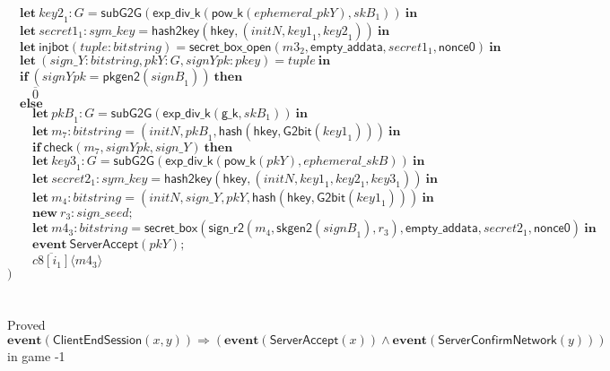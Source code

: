 \documentclass{article}
\newcommand{\coutput}[2]{\overline{#1}\langle{#2}\rangle}
\newcommand{\kw}[1]{\mathbf{#1}}
\newcommand{\kwf}[1]{\mathsf{#1}}
\newcommand{\var}[1]{\mathit{#1}}
\newcommand{\kwt}[1]{\mathit{#1}}
\newcommand{\kwc}[1]{\mathit{#1}}
\begin{document}
\begin{tabbing}
\>$\quad \kw{let}\ \var{key2}_{1}: \kwt{G} = \kwf{subG2G}(\kwf{exp{\_}div{\_}k}(\kwf{pow{\_}k}(\var{ephemeral{\_}pkY}), \var{skB}_{1}))\ \kw{in}$\\
\>$\quad \kw{let}\ \var{secret1}_{1}: \kwt{sym{\_}key} = \kwf{hash2key}(\kwf{hkey}, \kwf{}(\var{initN}, \var{key1}_{1}, \var{key2}_{1}))\ \kw{in}$\\
\>$\quad \kw{let}\ \kwf{injbot}(\var{tuple}: \kwt{bitstring}) = \kwf{secret{\_}box{\_}open}(\var{m3}_{2}, \kwf{empty{\_}addata}, \var{secret1}_{1}, \kwf{nonce0})\ \kw{in}$\\
\>$\quad \kw{let}\ \kwf{}(\var{sign{\_}Y}: \kwt{bitstring}, \var{pkY}: \kwt{G}, \var{signYpk}: \kwt{pkey}) = \var{tuple}\ \kw{in}$\\
\>$\quad \kw{if}\ (\var{signYpk}  =  \kwf{pkgen2}(\var{signB}_{1}))\ \kw{then}$\\
\>$\quad \quad \overline{0}$\\
\>$\quad \kw{else}$\\
\>$\quad \quad \kw{let}\ \var{pkB}_{1}: \kwt{G} = \kwf{subG2G}(\kwf{exp{\_}div{\_}k}(\kwf{g{\_}k}, \var{skB}_{1}))\ \kw{in}$\\
\>$\quad \quad \kw{let}\ \var{m}_{7}: \kwt{bitstring} = \kwf{}(\var{initN}, \var{pkB}_{1}, \kwf{hash}(\kwf{hkey}, \kwf{G2bit}(\var{key1}_{1})))\ \kw{in}$\\
\>$\quad \quad \kw{if}\ \kwf{check}(\var{m}_{7}, \var{signYpk}, \var{sign{\_}Y})\ \kw{then}$\\
\>$\quad \quad \kw{let}\ \var{key3}_{1}: \kwt{G} = \kwf{subG2G}(\kwf{exp{\_}div{\_}k}(\kwf{pow{\_}k}(\var{pkY}), \var{ephemeral{\_}skB}))\ \kw{in}$\\
\>$\quad \quad \kw{let}\ \var{secret2}_{1}: \kwt{sym{\_}key} = \kwf{hash2key}(\kwf{hkey}, \kwf{}(\var{initN}, \var{key1}_{1}, \var{key2}_{1}, \var{key3}_{1}))\ \kw{in}$\\
\>$\quad \quad \kw{let}\ \var{m}_{4}: \kwt{bitstring} = \kwf{}(\var{initN}, \var{sign{\_}Y}, \var{pkY}, \kwf{hash}(\kwf{hkey}, \kwf{G2bit}(\var{key1}_{1})))\ \kw{in}$\\
\>$\quad \quad \kw{new}\ \var{r}_{3}: \kwt{sign{\_}seed};$\\
\>$\quad \quad \kw{let}\ \var{m4}_{3}: \kwt{bitstring} = \kwf{secret{\_}box}(\kwf{sign{\_}r2}(\var{m}_{4}, \kwf{skgen2}(\var{signB}_{1}), \var{r}_{3}), \kwf{empty{\_}addata}, \var{secret2}_{1}, \kwf{nonce0})\ \kw{in}$\\
\>$\quad \quad \kw{event}\ \kwf{ServerAccept}(\var{pkY});$\\
\>$\quad \quad \coutput{\kwc{c8}[\var{i}_{1}]}{\var{m4}_{3}}$\\
\>$)$\\
\\
\\
Proved $\kw{event}(\kwf{ClientEndSession}(\var{x}, \var{y})) \Longrightarrow (\kw{event}(\kwf{ServerAccept}(\var{x})) \wedge \kw{event}(\kwf{ServerConfirmNetwork}(\var{y})))$ in game -1\\
\end{tabbing}
\end{document}
